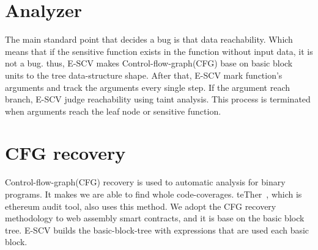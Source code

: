 \section{Analyzer}

The main standard point that decides a bug is that data reachability. Which means that if the sensitive function exists in the function without input data, it is not a bug. thus, E-SCV makes Control-flow-graph(CFG) base on basic block units to the tree data-structure shape. After that, E-SCV mark function's arguments and track the arguments every single step. If the argument reach branch, E-SCV judge reachability using taint analysis. This process is terminated when arguments reach the leaf node or sensitive function. 

\section{CFG recovery}
Control-flow-graph(CFG) recovery is used to automatic analysis for binary programs. It makes we are able to find whole code-coverages. teTher~\cite{krupp2018teether}, which is ethereum audit tool, also uses this method. We adopt the CFG recovery methodology to web assembly smart contracts, and it is base on the basic block tree. E-SCV builds the basic-block-tree with expressions that are used each basic block.




